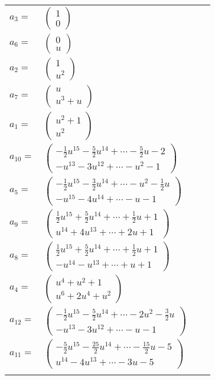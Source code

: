 \documentclass[1p]{elsarticle_modified}
\theoremstyle{definition}
\begin{document}
\begin{tabular}{m{7pt} m{180pt} m{7pt} m{180pt} }
\flushright $a_{3}=$&$\begin{pmatrix}1\\0\end{pmatrix}$ \\
\flushright $a_{6}=$&$\begin{pmatrix}0\\u\end{pmatrix}$ \\
\flushright $a_{2}=$&$\begin{pmatrix}1\\u^2\end{pmatrix}$ \\
\flushright $a_{7}=$&$\begin{pmatrix}u\\u^3+u\end{pmatrix}$ \\
\flushright $a_{1}=$&$\begin{pmatrix}u^2+1\\u^2\end{pmatrix}$ \\
\flushright $a_{10}=$&$\begin{pmatrix}-\frac{1}{2} u^{15}-\frac{5}{2} u^{14}+\cdots-\frac{5}{2} u-2\\- u^{13}-3 u^{12}+\cdots- u^2-1\end{pmatrix}$ \\
\flushright $a_{5}=$&$\begin{pmatrix}-\frac{1}{2} u^{15}-\frac{3}{2} u^{14}+\cdots- u^2-\frac{1}{2} u\\- u^{15}-4 u^{14}+\cdots- u-1\end{pmatrix}$ \\
\flushright $a_{9}=$&$\begin{pmatrix}\frac{1}{2} u^{15}+\frac{5}{2} u^{14}+\cdots+\frac{1}{2} u+1\\u^{14}+4 u^{13}+\cdots+2 u+1\end{pmatrix}$ \\
\flushright $a_{8}=$&$\begin{pmatrix}\frac{1}{2} u^{15}+\frac{5}{2} u^{14}+\cdots+\frac{1}{2} u+1\\- u^{14}- u^{13}+\cdots+u+1\end{pmatrix}$ \\
\flushright $a_{4}=$&$\begin{pmatrix}u^4+u^2+1\\u^6+2 u^4+u^2\end{pmatrix}$ \\
\flushright $a_{12}=$&$\begin{pmatrix}-\frac{1}{2} u^{15}-\frac{5}{2} u^{14}+\cdots-2 u^2-\frac{3}{2} u\\- u^{13}-3 u^{12}+\cdots- u-1\end{pmatrix}$ \\
\flushright $a_{11}=$&$\begin{pmatrix}-\frac{5}{2} u^{15}-\frac{25}{2} u^{14}+\cdots-\frac{15}{2} u-5\\u^{14}-4 u^{13}+\cdots-3 u-5\end{pmatrix}$\\&\end{tabular}
\end{document}
